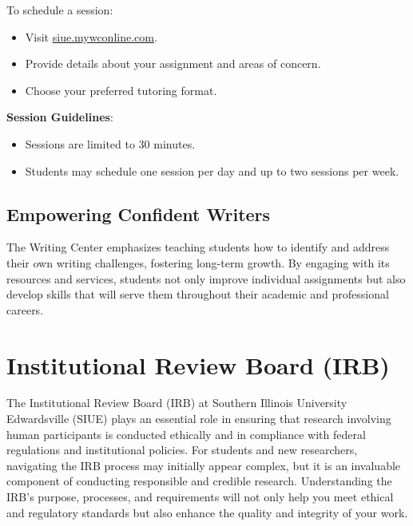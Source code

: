 \documentclass[
]{book}
\providecommand{\tightlist}{%
  \setlength{\itemsep}{0pt}\setlength{\parskip}{0pt}}
\begin{document}
To schedule a session:

\begin{itemize}
\tightlist
\item
  Visit \href{https://siue.mywconline.com/}{siue.mywconline.com}.
\item
  Provide details about your assignment and areas of concern.
\item
  Choose your preferred tutoring format.
\end{itemize}

\textbf{Session Guidelines}:

\begin{itemize}
\tightlist
\item
  Sessions are limited to 30 minutes.
\item
  Students may schedule one session per day and up to two sessions per week.
\end{itemize}

\subsection*{Empowering Confident Writers}\label{empowering-confident-writers}

The Writing Center emphasizes teaching students how to identify and address their own writing challenges, fostering long-term growth. By engaging with its resources and services, students not only improve individual assignments but also develop skills that will serve them throughout their academic and professional careers.

\section{Institutional Review Board (IRB)}\label{institutional-review-board-irb}

The Institutional Review Board (IRB) at Southern Illinois University Edwardsville (SIUE) plays an essential role in ensuring that research involving human participants is conducted ethically and in compliance with federal regulations and institutional policies. For students and new researchers, navigating the IRB process may initially appear complex, but it is an invaluable component of conducting responsible and credible research. Understanding the IRB's purpose, processes, and requirements will not only help you meet ethical and regulatory standards but also enhance the quality and integrity of your work.
\end{document}
